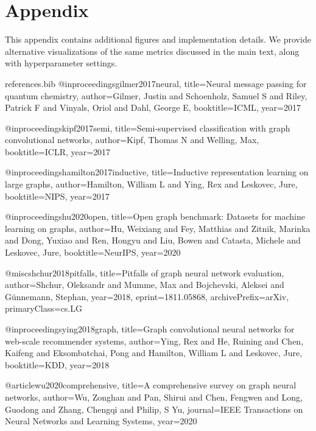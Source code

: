 \documentclass{article}
\begin{document}



\appendix
\section{Appendix}
This appendix contains additional figures and implementation details. We provide alternative visualizations of the same metrics discussed in the main text, along with hyperparameter settings. 


\begin{filecontents}{references.bib}
@inproceedings{gilmer2017neural,
  title={Neural message passing for quantum chemistry},
  author={Gilmer, Justin and Schoenholz, Samuel S and Riley, Patrick F and Vinyals, Oriol and Dahl, George E},
  booktitle={ICML},
  year={2017}
}

@inproceedings{kipf2017semi,
  title={Semi-supervised classification with graph convolutional networks},
  author={Kipf, Thomas N and Welling, Max},
  booktitle={ICLR},
  year={2017}
}

@inproceedings{hamilton2017inductive,
  title={Inductive representation learning on large graphs},
  author={Hamilton, William L and Ying, Rex and Leskovec, Jure},
  booktitle={NIPS},
  year={2017}
}

@inproceedings{hu2020open,
  title={Open graph benchmark: Datasets for machine learning on graphs},
  author={Hu, Weixiang and Fey, Matthias and Zitnik, Marinka and Dong, Yuxiao and Ren, Hongyu and Liu, Bowen and Catasta, Michele and Leskovec, Jure},
  booktitle={NeurIPS},
  year={2020}
}

@misc{shchur2018pitfalls,
  title={Pitfalls of graph neural network evaluation},
  author={Shchur, Oleksandr and Mumme, Max and Bojchevski, Aleksei and G{\"u}nnemann, Stephan},
  year={2018},
  eprint={1811.05868},
  archivePrefix={arXiv},
  primaryClass={cs.LG}
}

@inproceedings{ying2018graph,
  title={Graph convolutional neural networks for web-scale recommender systems},
  author={Ying, Rex and He, Ruining and Chen, Kaifeng and Eksombatchai, Pong and Hamilton, William L and Leskovec, Jure},
  booktitle={KDD},
  year={2018}
}

@article{wu2020comprehensive,
  title={A comprehensive survey on graph neural networks},
  author={Wu, Zonghan and Pan, Shirui and Chen, Fengwen and Long, Guodong and Zhang, Chengqi and Philip, S Yu},
  journal={IEEE Transactions on Neural Networks and Learning Systems},
  year={2020}
}
\end{filecontents}
\end{document}
